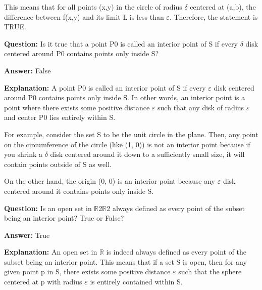 \documentclass{article}
\begin{document}
This means that for all points (x,y) in the circle of radius \ensuremath{\delta} centered at (a,b), the difference between f(x,y) and its limit L is less than \ensuremath{\varepsilon}. Therefore, the statement is TRUE.
                
                \vspace{0.5cm} 
        
            
                \textbf {Question:} Is it true that a point P0 is called an interior point of S if every \ensuremath{\delta} disk centered around P0 contains points only inside S?
                
                \textbf{Answer:} False

                \textbf{Explanation:} A point P0 is called an interior point of S if every \ensuremath{\varepsilon} disk centered around P0 contains points only inside S. In other words, an interior point is a point where there exists some positive distance \ensuremath{\varepsilon} such that any disk of radius \ensuremath{\varepsilon} and center P0 lies entirely within S.

For example, consider the set S to be the unit circle in the plane. Then, any point on the circumference of the circle (like (1, 0)) is not an interior point because if you shrink a \ensuremath{\delta} disk centered around it down to a sufficiently small size, it will contain points outside of S as well.

On the other hand, the origin (0, 0) is an interior point because any \ensuremath{\varepsilon} disk centered around it contains points only inside S.
                
                \vspace{0.5cm} 
        
            
                \textbf {Question:} Is an open set in \ensuremath{\mathbb{R}}2\ensuremath{\mathbb{R}}2 always defined as every point of the subset being an interior point? True or False?
                
                \textbf{Answer:} True

                \textbf{Explanation:} An open set in \ensuremath{\mathbb{R}}{\texttwosuperior} is indeed always defined as every point of the subset being an interior point. This means that if a set S is open, then for any given point p in S, there exists some positive distance \ensuremath{\varepsilon} such that the sphere centered at p with radius \ensuremath{\varepsilon} is entirely contained within S.
\end{document}
